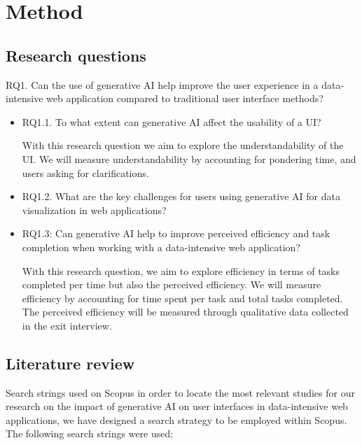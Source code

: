 \chapter{Method}
\label{chp:method}

\section{Research questions}
RQ1. Can the use of generative AI help improve the user experience in a data-intensive web application compared to traditional user interface methods?
\begin{itemize}
    \item RQ1.1. To what extent can generative AI affect the usability of a UI?

    With this research question we aim to explore the understandability of the UI. We will measure understandability by accounting for pondering time, and users asking for clarifications.

    \item RQ1.2. What are the key challenges for users using generative AI for data visualization in web applications?

    \item RQ1.3: Can generative AI help to improve perceived efficiency and task completion when working with a data-intensive web application?

    With this research question, we aim to explore efficiency in terms of tasks completed per time but also the perceived efficiency. We will measure efficiency by accounting for time spent per task and total tasks completed. The perceived efficiency will be measured through qualitative data collected in the exit interview.
    
\end{itemize}

\section{Literature review}
Search strings used on Scopus in order to locate the most relevant studies for our research on the impact of generative AI on user interfaces in data-intensive web applications, we have designed a search strategy to be employed within Scopus. The following search strings were used:

